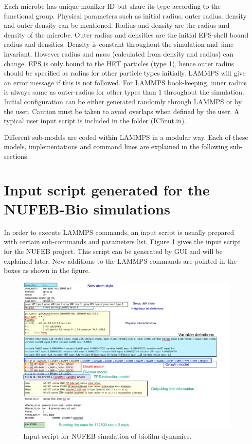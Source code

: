 \documentclass[11pt,a4paper,openright]{article}
\begin{document}
Each microbe has unique moniker ID but share its type according to the functional group. Physical parameters such as initial radius, outer radius, density and outer density can be mentioned. Radius and density are the radius and density of the microbe. Outer radius and densities are the initial EPS-shell bound radius and densities. Density is constant throughout the simulation and time invariant. However radius and mass (calculated from density and radius) can change. EPS is only bound to the HET particles (type 1), hence outer radius should be specified as radius for other particle types initially. LAMMPS will give an error message if this is not followed. For LAMMPS book-keeping, inner radius is always same as outer-radius for other types than 1 throughout the simulation. Initial configuration can be either generated randomly through LAMMPS or by the user. Caution must be taken to avoid overlaps when defined by the user. A typical user input script is included in the folder (IC5nut.in). 

Different sub-models are coded within LAMMPS in a modular way. Each of these models, implementations and command lines are explained in the following sub-sections.


\section{Input script generated for the NUFEB-Bio simulations}
In order to execute LAMMPS commands, an input script is usually prepared with certain sub-commands and parameters list. 
Figure \ref{fig:inputscript} gives the input script for the NUFEB project. This script can be generated by GUI and will be explained later. New additions to the LAMMPS commands are pointed in the boxes as shown in the figure. 

\begin{figure}[H]
\begin{center}
  \includegraphics[width=0.9\columnwidth]{Figs/Inputscript.pdf}
\caption{Input script for NUFEB simulation of biofilm dynamics.}
\label{fig:inputscript}       %
\end{center}
\end{figure}  
\end{document}
